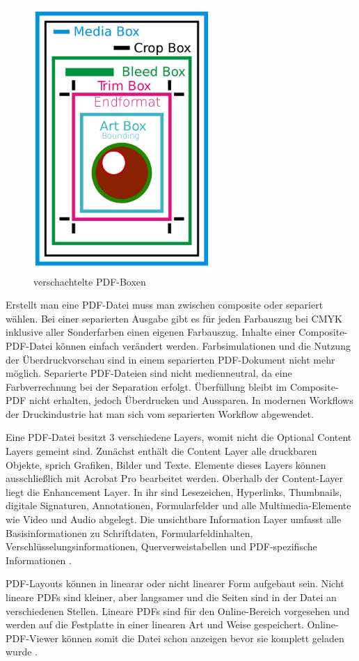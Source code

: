 \begin{figure}[!htb]
	\centering
	\includegraphics[width=0.6\textwidth]{"images/boxen-wiki-pdf-de.png"}
	\caption{verschachtelte PDF-Boxen \cite{wiki-pdf-de}}
	\label{fig:boxen}
\end{figure}

Erstellt man eine PDF-Datei muss man zwischen composite oder separiert wählen. Bei einer separierten Ausgabe gibt es für jeden Farbauszug bei CMYK inklusive aller Sonderfarben einen eigenen Farbauszug. Inhalte einer Composite-PDF-Datei können einfach verändert werden. Farbsimulationen und die Nutzung der Überdruckvorschau sind in einem separierten PDF-Dokument nicht mehr möglich. Separierte PDF-Dateien sind nicht medienneutral, da eine Farbverrechnung bei der Separation erfolgt. Überfüllung bleibt im Composite-PDF nicht erhalten, jedoch Überdrucken und Aussparen. In modernen Workflows der Druckindustrie hat man sich vom separierten Workflow abgewendet.
\par
Eine PDF-Datei besitzt 3 verschiedene Layers, womit nicht die Optional Content Layers gemeint sind.  Zunächst enthält die Content Layer alle druckbaren Objekte, sprich Grafiken, Bilder und Texte. Elemente dieses Layers können ausschließlich mit Acrobat Pro bearbeitet werden. Oberhalb der Content-Layer liegt die Enhancement Layer. In ihr sind Lesezeichen, Hyperlinks, Thumbnails, digitale Signaturen, Annotationen, Formularfelder und alle Multimedia-Elemente wie Video und Audio abgelegt. Die unsichtbare Information Layer umfasst alle Basisinformationen zu Schriftdaten, Formularfeldinhalten, Verschlüsselungsinformationen, Querverweistabellen und PDF-spezifische Informationen \cite{schneeberger}.
\par
PDF-Layouts können in linearar oder nicht linearer Form aufgebaut sein. Nicht lineare PDFs sind kleiner, aber langsamer und die Seiten sind in der Datei an verschiedenen Stellen. Lineare PDFs sind für den Online-Bereich vorgesehen und werden auf die Festplatte in einer linearen Art und Weise gespeichert. Online-PDF-Viewer können somit die Datei schon anzeigen bevor sie komplett geladen wurde \cite{fileformat}. 

